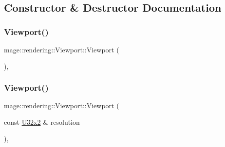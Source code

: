 \subsection{Constructor \& Destructor Documentation}
\hypertarget{classmage_1_1rendering_1_1_viewport_a93c3a23a87fb30301ab9f400bd2c128a}{}\label{classmage_1_1rendering_1_1_viewport_a93c3a23a87fb30301ab9f400bd2c128a} 
\subsubsection{\texorpdfstring{Viewport()}{Viewport()}\hspace{0.1cm}{\footnotesize\ttfamily [1/7]}}
{\footnotesize\ttfamily mage\+::rendering\+::\+Viewport\+::\+Viewport (\begin{DoxyParamCaption}{ }\end{DoxyParamCaption})\hspace{0.3cm}{\ttfamily [explicit]}, {\ttfamily [noexcept]}}

\hypertarget{classmage_1_1rendering_1_1_viewport_a04b2198ce2554fd849d713bc6551565d}{}\label{classmage_1_1rendering_1_1_viewport_a04b2198ce2554fd849d713bc6551565d} 
\subsubsection{\texorpdfstring{Viewport()}{Viewport()}\hspace{0.1cm}{\footnotesize\ttfamily [2/7]}}
{\footnotesize\ttfamily mage\+::rendering\+::\+Viewport\+::\+Viewport (\begin{DoxyParamCaption}\item[{const \hyperlink{namespacemage_a88e05bff0300120c013285d3dcad95c5}{U32x2} \&}]{resolution }\end{DoxyParamCaption})\hspace{0.3cm}{\ttfamily [explicit]}, {\ttfamily [noexcept]}}

\hypertarget{classmage_1_1rendering_1_1_viewport_a2e9aafc771d765259669f0bbeb8fffac}{}\label{classmage_1_1rendering_1_1_viewport_a2e9aafc771d765259669f0bbeb8fffac} 
